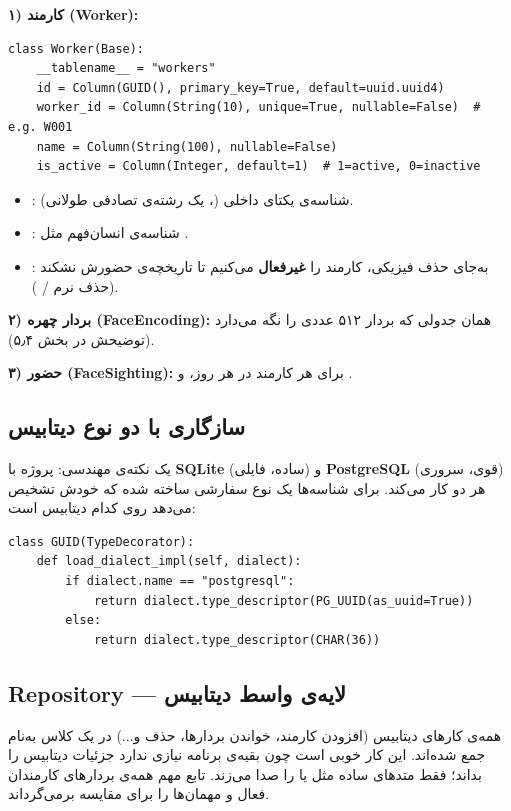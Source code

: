 \documentclass[12pt,a4paper]{article}
\begin{document}
\textbf{۱) کارمند (Worker):}
\begin{latin}
\begin{lstlisting}
class Worker(Base):
    __tablename__ = "workers"
    id = Column(GUID(), primary_key=True, default=uuid.uuid4)
    worker_id = Column(String(10), unique=True, nullable=False)  # e.g. W001
    name = Column(String(100), nullable=False)
    is_active = Column(Integer, default=1)  # 1=active, 0=inactive
\end{lstlisting}
\end{latin}
\begin{itemize}[rightmargin=0pt]
  \item {}: شناسه‌ی یکتای داخلی (، یک رشته‌ی تصادفی طولانی).
  \item {}: شناسه‌ی انسان‌فهم مثل .
  \item {}: به‌جای حذف فیزیکی، کارمند را \textbf{غیرفعال} می‌کنیم تا تاریخچه‌ی حضورش نشکند (حذف نرم / ).
\end{itemize}

\textbf{۲) بردار چهره (FaceEncoding):} همان جدولی که بردار ۵۱۲ عددی را نگه می‌دارد (توضیحش در بخش ۵٫۴).

\textbf{۳) حضور (FaceSighting):} برای هر کارمند در هر روز،  و .

\subsection{سازگاری با دو نوع دیتابیس}
یک نکته‌ی مهندسی: پروژه با \textbf{SQLite} (ساده، فایلی) و \textbf{PostgreSQL} (قوی، سروری) هر دو کار می‌کند. برای شناسه‌ها یک نوع سفارشی  ساخته شده که خودش تشخیص می‌دهد روی کدام دیتابیس است:

\begin{latin}
\begin{lstlisting}
class GUID(TypeDecorator):
    def load_dialect_impl(self, dialect):
        if dialect.name == "postgresql":
            return dialect.type_descriptor(PG_UUID(as_uuid=True))
        else:
            return dialect.type_descriptor(CHAR(36))
\end{lstlisting}
\end{latin}

\subsection{Repository — لایه‌ی واسط دیتابیس}
همه‌ی کارهای دیتابیس (افزودن کارمند، خواندن بردارها، حذف و...) در یک کلاس به‌نام  جمع شده‌اند. این کار خوبی است چون بقیه‌ی برنامه نیازی ندارد جزئیات دیتابیس را بداند؛ فقط متدهای ساده مثل  یا  را صدا می‌زند. تابع مهم  همه‌ی بردارهای کارمندان فعال و مهمان‌ها را برای مقایسه برمی‌گرداند.
\end{document}

